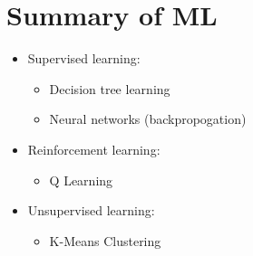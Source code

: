 \documentclass[11pt]{article}
\begin{document}
\section{Summary of ML}
\label{sec:org580c884}
\begin{itemize}
\item Supervised learning:
\begin{itemize}
\item Decision tree learning
\item Neural networks (backpropogation)
\end{itemize}
\item Reinforcement learning:
\begin{itemize}
\item Q Learning
\end{itemize}
\item Unsupervised learning:
\begin{itemize}
\item K-Means Clustering
\end{itemize}
\end{itemize}
\end{document}
